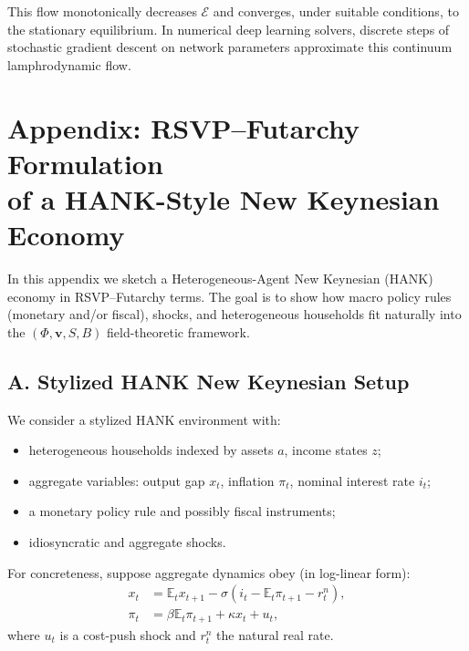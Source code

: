 \documentclass[12pt]{article}
\begin{document}
This flow monotonically decreases $\mathcal{E}$ and converges, under
suitable conditions, to the stationary equilibrium. In numerical deep
learning solvers, discrete steps of stochastic gradient descent on
network parameters approximate this continuum lamphrodynamic flow.


\section*{Appendix: RSVP--Futarchy Formulation\\
of a HANK-Style New Keynesian Economy}

In this appendix we sketch a Heterogeneous-Agent New Keynesian (HANK)
economy in RSVP--Futarchy terms. The goal is to show how macro policy
rules (monetary and/or fiscal), shocks, and heterogeneous households fit
naturally into the $(\Phi,\mathbf{v},S,B)$ field-theoretic framework.

\subsection*{A. Stylized HANK New Keynesian Setup}

We consider a stylized HANK environment with:
\begin{itemize}
    \item heterogeneous households indexed by assets $a$, income states $z$;
    \item aggregate variables: output gap $x_t$, inflation $\pi_t$,
          nominal interest rate $i_t$;
    \item a monetary policy rule and possibly fiscal instruments;
    \item idiosyncratic and aggregate shocks.
\end{itemize}

For concreteness, suppose aggregate dynamics obey (in log-linear form):
\begin{align}
x_t &= \mathbb{E}_t x_{t+1} - \sigma (i_t - \mathbb{E}_t \pi_{t+1} - r_t^{n}),\\
\pi_t &= \beta \mathbb{E}_t \pi_{t+1} + \kappa x_t + u_t,
\end{align}
where $u_t$ is a cost-push shock and $r_t^{n}$ the natural real rate.
\end{document}
